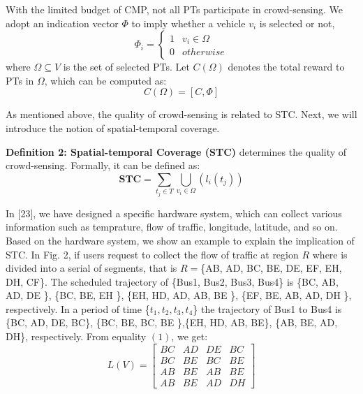 \documentclass[journal]{IEEEtran}
\begin{document}
With the limited budget of CMP, not all PTs participate in crowd-sensing. We adopt an indication vector $\Phi $ to imply whether a vehicle $v_{i}$ is selected or not,
\begin{equation}
\Phi_{i}= \left\{\begin{matrix}
1&v_{i}\in \Omega \\ 
0&otherwise\end{matrix}\right.
\end{equation}
where $\Omega \subseteq V$ is the set of selected PTs. Let $C(\Omega)$ denotes the total reward to PTs in $\Omega$, which can be computed as:
\begin{equation}
C(\Omega )=\left [ C,\Phi  \right ]
\end{equation}

As mentioned above, the quality of crowd-sensing is related to STC. Next, we will introduce the notion of spatial-temporal coverage.

\noindent
\textbf{Definition 2: Spatial-temporal Coverage (STC)} determines the quality of crowd-sensing. Formally, it can be defined as:
\begin{equation}
\textbf{STC}=\sum_{t_{j}\in T}\bigcup_{v_{i}\in \Omega}\left (l_{i}(t_{j}) \right)
\end{equation}

 In [23], we have designed a specific hardware system, which can collect various information such as temprature, flow of traffic, longitude, latitude, and so on. Based on the hardware system, we show an example to explain the implication of STC. In Fig. 2, if users request to collect the flow of traffic at region $R$ where is divided into a serial of segments, that is $R=$\{AB, AD, BC, BE, DE, EF, EH, DH, CF\}. The scheduled trajectory of \{Bus1, Bus2, Bus3, Bus4\} is \{BC, AB, AD, DE \}, \{BC, BE, EH \}, \{EH, HD, AD, AB, BE \}, \{EF, BE, AB, AD, DH \}, respectively. In a period of time \{$t_{1},t_{2},t_{3},t_{4}$\}  the trajectory of  Bus1 to Bus4 is \{BC, AD, DE, BC\}, \{BC, BE, BC, BE \},\{EH, HD, AB, BE\}, \{AB, BE, AD, DH\}, respectively. From equality $(1)$, we get:
\begin{equation}
L(V)=\begin{bmatrix}
BC &AD &DE &BC \\ 
BC& BE &BC &BE\\ 
AB& BE &AB &BE\\ 
AB& BE &AD &DH
\end{bmatrix}
\end{equation}
\end{document}
